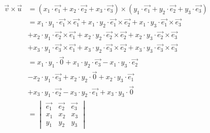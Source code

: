 \documentclass[12pt]{article}
\begin{document}
    \begin{align*}
        \overrightarrow{v}\times\overrightarrow{u} & = (x_1\cdot\overrightarrow{e_1}+x_2\cdot\overrightarrow{e_2}+x_3\cdot\overrightarrow{e_3})\times(y_1\cdot\overrightarrow{e_1}+y_2\cdot\overrightarrow{e_2}+y_3\cdot\overrightarrow{e_3})                \\
                                                   & = x_1\cdot y_1\cdot \overrightarrow{e_1}\times \overrightarrow{e_1}+x_1\cdot y_2\cdot \overrightarrow{e_1}\times \overrightarrow{e_2}+x_1\cdot y_3\cdot \overrightarrow{e_1}\times \overrightarrow{e_3} \\
                                                   & + x_2\cdot y_1\cdot \overrightarrow{e_2}\times \overrightarrow{e_1}+x_2\cdot y_2\cdot \overrightarrow{e_2}\times \overrightarrow{e_2}+x_2\cdot y_3\cdot \overrightarrow{e_2}\times \overrightarrow{e_3} \\
                                                   & + x_3\cdot y_1\cdot \overrightarrow{e_3}\times \overrightarrow{e_1}+x_3\cdot y_2\cdot \overrightarrow{e_3}\times \overrightarrow{e_2}+x_3\cdot y_3\cdot \overrightarrow{e_3}\times \overrightarrow{e_3} \\
                                                   & = x_1\cdot y_1\cdot \overrightarrow{0} + x_1\cdot y_2\cdot \overrightarrow{e_3}-x_1\cdot y_3\cdot \overrightarrow{e_2}                                                                                  \\
                                                   & - x_2\cdot y_1\cdot \overrightarrow{e_3}+x_2\cdot y_2\cdot \overrightarrow{0}+x_2\cdot y_3\cdot \overrightarrow{e_1}                                                                                    \\
                                                   & + x_3\cdot y_1\cdot \overrightarrow{e_2}-x_3\cdot y_2\cdot \overrightarrow{e_1}+x_3\cdot y_3\cdot \overrightarrow{0}                                                                                    \\
                                                   & = \begin{vmatrix}
                                                           \overrightarrow{e_1} & \overrightarrow{e_2} & \overrightarrow{e_3} \\
                                                           x_1                  & x_2                  & x_3                  \\
                                                           y_1                  & y_2                  & y_3
                                                       \end{vmatrix}
    \end{align*}
\end{document}
